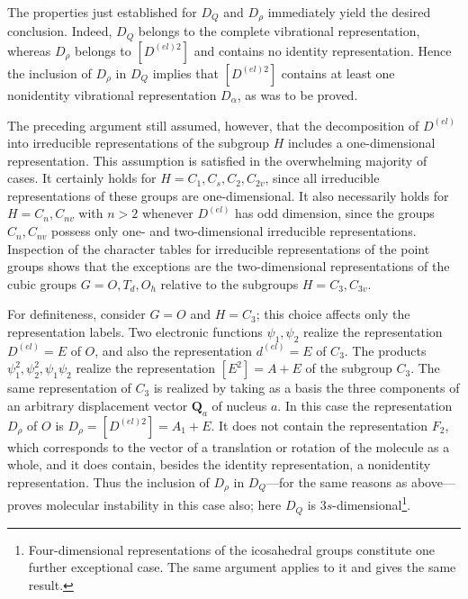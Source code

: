 The properties just established for $D_Q$ and $D_\rho$ immediately yield the desired conclusion. Indeed, $D_Q$ belongs to the complete vibrational representation, whereas $D_\rho$ belongs to $[D^{(el)2}]$ and contains no identity representation. Hence the inclusion of $D_\rho$ in $D_Q$ implies that $[D^{(el)2}]$ contains at least one nonidentity vibrational representation $D_\alpha$, as was to be proved.

The preceding argument still assumed, however, that the decomposition of $D^{(el)}$ into irreducible representations of the subgroup $H$ includes a one-dimensional representation. This assumption is satisfied in the overwhelming majority of cases. It certainly holds for $H=C_1,C_s,C_2,C_{2v}$, since all irreducible representations of these groups are one-dimensional. It also necessarily holds for $H=C_n,C_{nv}$ with $n>2$ whenever $D^{(el)}$ has odd dimension, since the groups $C_n,C_{nv}$ possess only one- and two-dimensional irreducible representations. Inspection of the character tables for irreducible representations of the point groups shows that the exceptions are the two-dimensional representations of the cubic groups $G=O,T_d,O_h$ relative to the subgroups $H=C_3,C_{3v}$.

For definiteness, consider $G=O$ and $H=C_3$; this choice affects only the representation labels. Two electronic functions $\psi_1,\psi_2$ realize the representation $D^{(el)}=E$ of $O$, and also the representation $d^{(el)}=E$ of $C_3$. The products $\psi_1^2,\psi_2^2,\psi_1\psi_2$ realize the representation $[E^2]=A+E$ of the subgroup $C_3$. The same representation of $C_3$ is realized by taking as a basis the three components of an arbitrary displacement vector $\mathbf Q_a$ of nucleus $a$. In this case the representation $D_\rho$ of $O$ is $D_\rho=[D^{(el)2}]=A_1+E$. It does not contain the representation $F_2$, which corresponds to the vector of a translation or rotation of the molecule as a whole, and it does contain, besides the identity representation, a nonidentity representation. Thus the inclusion of $D_\rho$ in $D_Q$---for the same reasons as above---proves molecular instability in this case also; here $D_Q$ is $3s$-dimensional\footnote{Four-dimensional representations of the icosahedral groups constitute one further exceptional case. The same argument applies to it and gives the same result.}.

